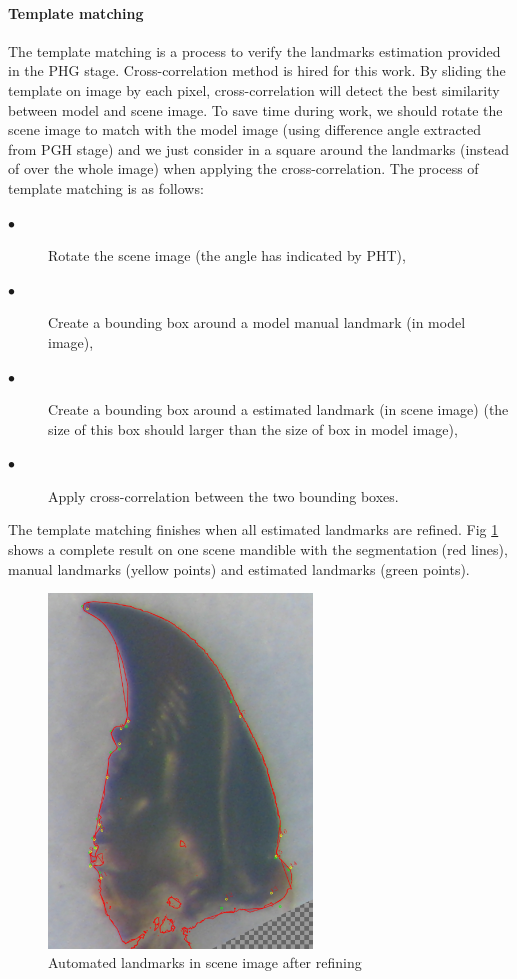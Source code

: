 \documentclass[twoside,twocolumn,10pt]{article}
\begin{document}
\paragraph{Template matching}
The template matching is a process to verify the landmarks estimation
provided in the PHG stage. Cross-correlation method\cite{knapp1976generalized} is hired for this work. By sliding the template on image by each pixel, cross-correlation will detect the best similarity between model and scene image. To save time during work, we should rotate the scene image to match with the model image (using difference angle extracted from PGH stage) and we just consider in a square around the landmarks (instead of over the whole image) when applying the cross-correlation. The process of template matching is as follows:
{\small{
\begin{description}
\item[$\bullet$] Rotate the scene image (the angle has indicated by PHT),
\item[$\bullet$] Create a bounding box around a model manual landmark (in model image),
\item[$\bullet$] Create a bounding box around a estimated landmark (in scene image) (the size of this box should larger than the size of box in model image),
\item[$\bullet$] Apply cross-correlation between the two bounding boxes.
\end{description}
}}
The template matching finishes when all estimated landmarks are
refined. Fig \ref{lm_hist} shows a complete result on one scene
mandible with the segmentation (red lines), manual landmarks (yellow
points) and estimated landmarks (green points).
\begin{figure}[h!]
\centering
\includegraphics[width=7cm]{./images/Screenshot3.png}
\caption{\small{Automated landmarks in scene image after refining}}
\label{lm_hist}
\end{figure}
\end{document}
